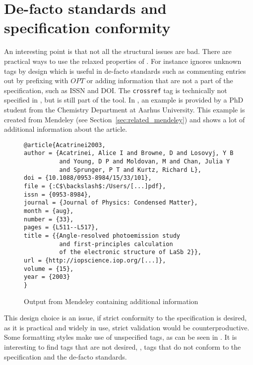 \section{De-facto standards and specification conformity}
\label{sec:problems_de_facto}

An interesting point is that not all the structural issues are bad.
There are practical ways to use the relaxed properties of {\bibtex}.
For instance {\bibtex} ignores unknown tags by design which is useful
in de-facto standards such as commenting entries out by prefixing with
$OPT$ or adding information that are not a part of the {\bibtex}
specification, such as ISSN and DOI.  The \texttt{crossref} tag is
technically not specified in {\bibtex}, but is still part of the tool.
In , an example is provided by a PhD
student from the Chemistry Department at Aarhus University.  This
example is created from Mendeley (see
Section~\ref{sec:related_mendeley}) and shows a lot of additional
information about the article.

\begin{figure}
  \centering
\begin{small}
\begin{verbatim}
@article{Acatrinei2003,
author = {Acatrinei, Alice I and Browne, D and Losovyj, Y B
          and Young, D P and Moldovan, M and Chan, Julia Y
          and Sprunger, P T and Kurtz, Richard L},
doi = {10.1088/0953-8984/15/33/101},
file = {:C$\backslash$:/Users/[...]pdf},
issn = {0953-8984},
journal = {Journal of Physics: Condensed Matter},
month = {aug},
number = {33},
pages = {L511--L517},
title = {{Angle-resolved photoemission study
          and first-principles calculation
          of the electronic structure of LaSb 2}},
url = {http://iopscience.iop.org/[...]},
volume = {15},
year = {2003}
}
\end{verbatim}
\end{small}
  \caption{Output from Mendeley containing additional information}
\label{fig:mendeley_output}
\end{figure}

This design choice is an issue, if strict conformity to the
specification is desired, as it is practical and widely in use, strict
validation would be counterproductive.  Some formatting styles make
use of unspecified tags, as can be seen in
. It is interesting to find tags that are
not desired, \ie, tags that do not conform to the specification and
the de-facto standards.


